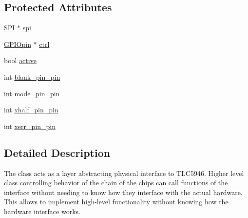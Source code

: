 \subsection*{Protected Attributes}
\begin{DoxyCompactItemize}
\item 
\hyperlink{class_s_p_i}{S\-P\-I} $\ast$ \hyperlink{class_t_l_c5946phy_aa1cd89ab21c1ce96acc6d2cc8af4136e}{spi}
\item 
\hyperlink{class_g_p_i_opin}{G\-P\-I\-Opin} $\ast$ \hyperlink{class_t_l_c5946phy_ad593ca4b96986ce8e40c833ed5ed3769}{ctrl}
\item 
bool \hyperlink{class_t_l_c5946phy_a6f0eea08d31a0209e5bc561b93a43067}{active}
\item 
int \hyperlink{class_t_l_c5946phy_a99fc1c99ddad63c7a7b15034ac9cffda}{blank\-\_\-pin\-\_\-pin}
\item 
int \hyperlink{class_t_l_c5946phy_a21c925ef7ce83c48daaebb56f994a720}{mode\-\_\-pin\-\_\-pin}
\item 
int \hyperlink{class_t_l_c5946phy_a072b879adb9d018b4a9905b53cb497f0}{xhalf\-\_\-pin\-\_\-pin}
\item 
int \hyperlink{class_t_l_c5946phy_a4c79de11b56731d25e7f0f0455b960f0}{xerr\-\_\-pin\-\_\-pin}
\end{DoxyCompactItemize}


\subsection{Detailed Description}
The class acts as a layer abstracting physical interface to T\-L\-C5946. Higher level class controlling behavior of the chain of the chips can call functions of the interface without needing to know how they interface with the actual hardware. This allows to implement high-\/level functionality without knowing how the hardware interface works. 

